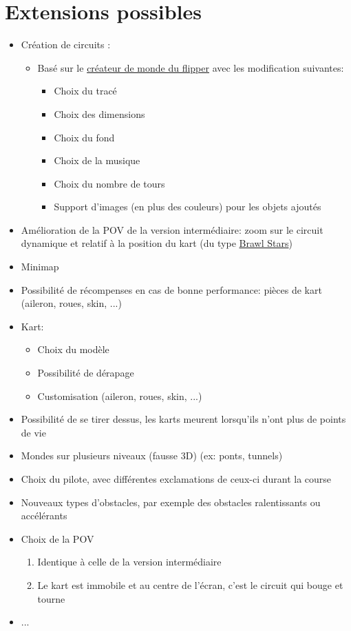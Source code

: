 \documentclass{article}
\begin{document}
\section{Extensions possibles}
\begin{itemize}
    \item Création de circuits :
          \begin{itemize}
              \item Basé sur le \href{https://lj44.ch/creator/flipper}{créateur de monde du flipper} avec les modification suivantes: \begin{itemize}
                        \item Choix du tracé
                        \item Choix des dimensions
                        \item Choix du fond
                        \item Choix de la musique
                        \item Choix du nombre de tours
                        \item Support d'images (en plus des couleurs) pour les objets ajoutés
                    \end{itemize}
          \end{itemize}
    \item Amélioration de la POV de la version intermédiaire: zoom sur le circuit dynamique et relatif à la position du kart (du type \href{https://youtu.be/ngyf3bssoKY}{Brawl Stars})
    \item Minimap
    \item Possibilité de récompenses en cas de bonne performance: pièces de kart (aileron, roues, skin, ...)
    \item Kart: \begin{itemize}
              \item Choix du modèle
              \item Possibilité de dérapage
              \item Customisation (aileron, roues, skin, ...)
          \end{itemize}
    \item Possibilité de se tirer dessus, les karts meurent lorsqu'ils n'ont plus de points de vie
    \item Mondes sur plusieurs niveaux (fausse 3D) (ex: ponts, tunnels)
    \item Choix du pilote, avec différentes exclamations de ceux-ci durant la course
    \item Nouveaux types d'obstacles, par exemple des obstacles ralentissants ou accélérants
    \item Choix de la POV \begin{enumerate}
              \item Identique à celle de la version intermédiaire
              \item Le kart est immobile et au centre de l'écran, c'est le circuit qui bouge et tourne
          \end{enumerate}
    \item ...
\end{itemize}
\end{document}
